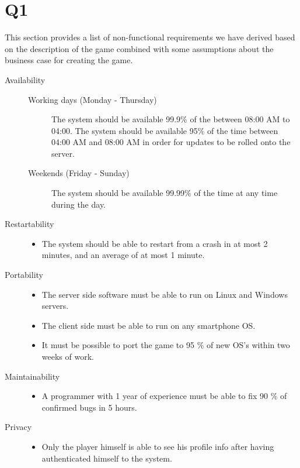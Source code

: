 \section{Q1}
This section provides a list of non-functional requirements we have derived based on the description of the game combined with some assumptions about the business case for creating the game.
\begin{description}

\item [Availability] \hfill 
	\begin{description}
		\item[Working days (Monday - Thursday)] The system should be available 99.9\% of the between 08:00 AM to 04:00. The system should be available 95\% of the time between 04:00 AM and 08:00 AM in order for updates to be rolled onto the server.
		\item[Weekends (Friday - Sunday)] The system should be available 99.99\% of the time at any time during the day. 
	\end{description}

\item [Restartability] \hfill 
	\begin{itemize}
	   \item The system should be able to restart from a crash in at most 2 minutes, and an average of at most 1 minute.
	\end{itemize}

\item [Portability] \hfill 
	\begin{itemize}
		\item The server side software must be able to run on Linux and Windows servers.
		\item The client side must be able to run on any smartphone OS.
		\item It must be possible to port the game to 95 \% of new OS's within two weeks of work.
	\end{itemize}

\item [Maintainability] \hfill 
	\begin{itemize}
	  	\item A programmer with 1 year of experience must be able to fix 90 \% of confirmed bugs in 5 hours.
	\end{itemize}



\item [Privacy] \hfill 
	\begin{itemize}
		\item Only the player himself is able to see his profile info after having authenticated himself to the system.
	\end{itemize}


\end{description}
